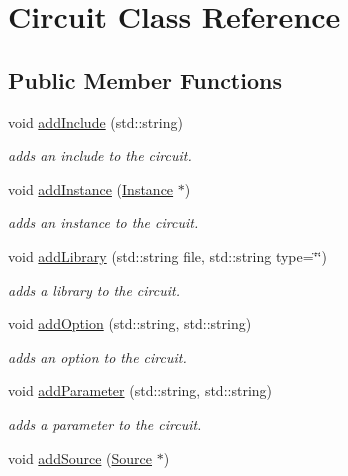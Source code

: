 \hypertarget{class_s_p_i_c_e_1_1_circuit}{\section{Circuit Class Reference}
\label{class_s_p_i_c_e_1_1_circuit}
}
\subsection*{Public Member Functions}
\begin{DoxyCompactItemize}
\item 
void \hyperlink{class_s_p_i_c_e_1_1_circuit_a30fc53c4da54215fdec3ab1b96ea1943}{add\-Include} (std\-::string)
\begin{DoxyCompactList}\small\item\em adds an include to the circuit. \end{DoxyCompactList}\item 
void \hyperlink{class_s_p_i_c_e_1_1_circuit_a7bb4a4532643568ab1ac2c229185a88e}{add\-Instance} (\hyperlink{class_s_p_i_c_e_1_1_instance}{Instance} $\ast$)
\begin{DoxyCompactList}\small\item\em adds an instance to the circuit. \end{DoxyCompactList}\item 
void \hyperlink{class_s_p_i_c_e_1_1_circuit_a49939060cc1cb8e4bfaf003025032096}{add\-Library} (std\-::string file, std\-::string type=\char`\"{}\char`\"{})
\begin{DoxyCompactList}\small\item\em adds a library to the circuit. \end{DoxyCompactList}\item 
void \hyperlink{class_s_p_i_c_e_1_1_circuit_a1abe34b48e2b6e1834a143fdef159cb9}{add\-Option} (std\-::string, std\-::string)
\begin{DoxyCompactList}\small\item\em adds an option to the circuit. \end{DoxyCompactList}\item 
void \hyperlink{class_s_p_i_c_e_1_1_circuit_ab3ab147a16bc490ce96db905a4ca271c}{add\-Parameter} (std\-::string, std\-::string)
\begin{DoxyCompactList}\small\item\em adds a parameter to the circuit. \end{DoxyCompactList}\item 
void \hyperlink{class_s_p_i_c_e_1_1_circuit_a627cf18c2763bb59f3d7e5142873251c}{add\-Source} (\hyperlink{class_s_p_i_c_e_1_1_source}{Source} $\ast$)

\end{DoxyCompactItemize}
